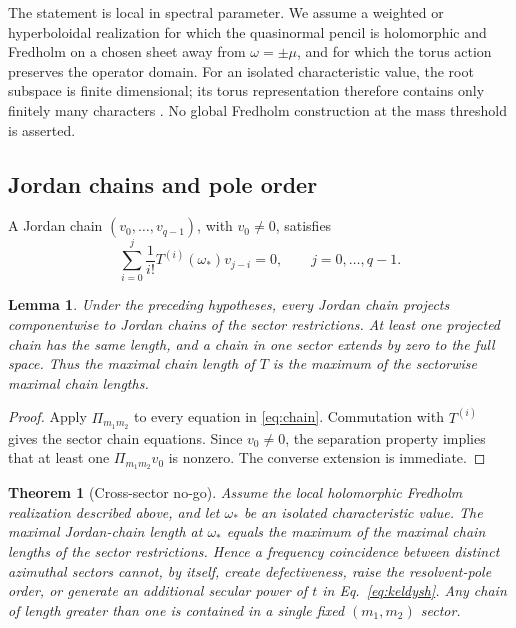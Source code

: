 \documentclass[10pt]{article}
\theoremstyle{plain}
\newtheorem{lemma}{Lemma}
\newtheorem{theorem}{Theorem}
\begin{document}
The statement is local in spectral parameter. We assume a weighted or
hyperboloidal realization for which the quasinormal pencil is holomorphic and
Fredholm on a chosen sheet away from $\omega=\pm\mu$, and for which the torus
action preserves the operator domain. For an isolated characteristic value, the
root subspace is finite dimensional; its torus representation therefore
contains only finitely many characters \citep{guttel2017}. No global Fredholm
construction at the mass threshold is asserted.

\subsection{Jordan chains and pole order}

A Jordan chain $(v_0,\dots,v_{q-1})$, with $v_0\neq0$, satisfies
\begin{equation}
\sum_{i=0}^{j}\frac{1}{i!}T^{(i)}(\omega_*)v_{j-i}=0,\qquad j=0,\dots,q-1.
\label{eq:chain}
\end{equation}

\begin{lemma}
Under the preceding hypotheses, every Jordan chain projects componentwise to
Jordan chains of the sector restrictions. At least one projected chain has the
same length, and a chain in one sector extends by zero to the full space. Thus
the maximal chain length of $T$ is the maximum of the sectorwise maximal chain
lengths.
\end{lemma}

\begin{proof}
Apply $\Pi_{m_1m_2}$ to every equation in \eqref{eq:chain}. Commutation with
$T^{(i)}$ gives the sector chain equations. Since $v_0\neq0$, the separation
property implies that at least one $\Pi_{m_1m_2}v_0$ is nonzero. The converse
extension is immediate.
\end{proof}

\begin{theorem}[Cross-sector no-go]
Assume the local holomorphic Fredholm realization described above, and let
$\omega_*$ be an isolated characteristic value. The maximal Jordan-chain length
at $\omega_*$ equals the maximum of the maximal chain lengths of the sector
restrictions. Hence a frequency coincidence between distinct azimuthal sectors
cannot, by itself, create defectiveness, raise the resolvent-pole order, or
generate an additional secular power of $t$ in Eq.~\eqref{eq:keldysh}. Any
chain of length greater than one is contained in a single fixed $(m_1,m_2)$
sector.
\end{theorem}
\end{document}
